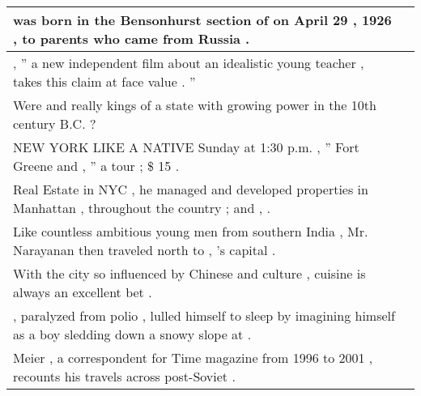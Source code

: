 \begin{table}
\begin{tabular}{p{} P{1,3cm} }
\hline
{} {\underline{} was born in the Bensonhurst section of \underline{} on April 29 , 1926 , to parents who came from Russia .} &    \\ 
\hline
{} {\underline{} , '' a new independent film about an idealistic young \underline{} teacher , takes this claim at face value . ''} &    \\ 
\hline
{} {Were \underline{} and \underline{} really kings of a state with growing power in the 10th century B.C. ?} &    \\ 
\hline
{} {NEW YORK LIKE A NATIVE Sunday at 1:30 p.m. , '' Fort Greene and \underline{} , '' a \underline{} tour ; \$ 15 .} &    \\ 
\hline
{} {Real Estate in NYC , he managed and developed properties in Manhattan , throughout the country ; and \underline{} , \underline{} .} &    \\ 
\hline
{} {Like countless ambitious young men from southern India , Mr. Narayanan then traveled north to \underline{} , \underline{} 's capital .} &    \\ 
\hline
{} {With the city so influenced by Chinese and \underline{} culture , \underline{} cuisine is always an excellent bet .} &    \\ 
\hline
{} {\underline{} , paralyzed from polio , lulled himself to sleep by imagining himself as a boy sledding down a snowy slope at \underline{} .} &    \\ 
\hline
{} {Meier , a \underline{} correspondent for Time magazine from 1996 to 2001 , recounts his travels across post-Soviet \underline{} .} &    \\ 

\end{tabular}
\end{table}
